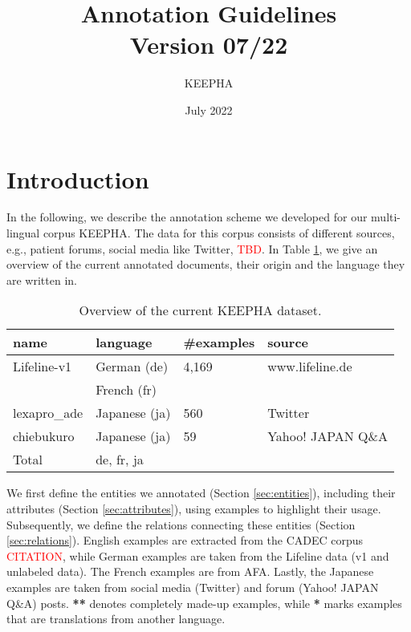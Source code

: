 \documentclass[12pt]{article}
\title{Annotation Guidelines\\ Version 07/22}
\author{KEEPHA}
\date{July 2022}
\theoremstyle{definition}
\begin{document}
\maketitle

\tableofcontents
\clearpage

\section{Introduction}
In the following, we describe the annotation scheme we developed for our multi-lingual corpus KEEPHA.
The data for this corpus consists of different sources, e.g., patient forums, social media like Twitter,  \textcolor{red}{TBD}.
In Table \ref{tab:data}, we give an overview of the current annotated documents, their origin and the language they are written in.

\begin{table}[h]
\centering
\begin{tabular}{@{}llll@{}}
\toprule
\textbf{name}   & {\textbf{language}}   & \textbf{\#examples}   & \textbf{source} \\ \midrule

Lifeline-v1     &  German (de)          & 4,169                 &  www.lifeline.de \\ 

                & French (fr)           &                       &                   \\
lexapro\_ade    & Japanese (ja)         & 560                   & Twitter                  \\
chiebukuro & Japanese (ja) & 59 & Yahoo! JAPAN Q\&A\\
\midrule

Total           & de, fr, ja            &                       & \\

\bottomrule
\end{tabular}
\caption{Overview of the current KEEPHA dataset.}
\label{tab:data}
\end{table}


\noindent We first define the entities we annotated (Section \ref{sec:entities}), including their attributes (Section \ref{sec:attributes}), using examples to highlight their usage.
Subsequently, we define the relations connecting these entities (Section \ref{sec:relations}).
English examples are extracted from the CADEC corpus \textcolor{red}{CITATION}, while German examples are taken from the Lifeline data (v1 and unlabeled data).
The French examples are from AFA.
Lastly, the Japanese examples are taken from social media (Twitter) and forum (Yahoo! JAPAN Q\&A) posts.
\textbf{**} denotes completely made-up examples, while \textbf{*} marks examples that are translations from another language. 
\end{document}
